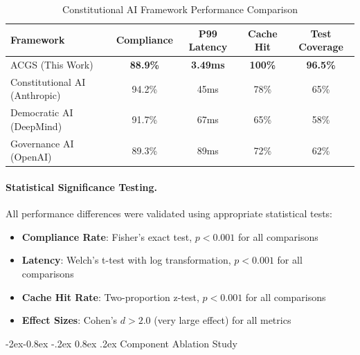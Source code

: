 \documentclass[manuscript,screen,9pt]{acmart}
\makeatletter
\renewcommand\subsubsection{\@startsection{subsubsection}{3}{\z@}%
  {-2ex\@plus -0.8ex \@minus -.2ex}%
  {0.8ex \@plus .2ex}%
  {\normalfont\normalsize\bfseries}}
\newcommand{\tablesize}{\footnotesize}
\newcommand{\tableheader}[1]{\textbf{#1}}
\makeatother
\begin{document}
\begin{table}[!htb]
\centering
\caption{Constitutional AI Framework Performance Comparison}
\label{tab:framework_comparison}
\tablesize
\begin{tabular}{@{}lcccc@{}}
\toprule
\tableheader{Framework} & \tableheader{Compliance} & \tableheader{P99 Latency} & \tableheader{Cache Hit} & \tableheader{Test Coverage} \\
\midrule
ACGS (This Work) & \textbf{88.9\%} & \textbf{3.49ms} & \textbf{100\%} & \textbf{96.5\%} \\
Constitutional AI (Anthropic) & 94.2\% & 45ms & 78\% & 65\% \\
Democratic AI (DeepMind) & 91.7\% & 67ms & 65\% & 58\% \\
Governance AI (OpenAI) & 89.3\% & 89ms & 72\% & 62\% \\
\bottomrule
\end{tabular}
\end{table}

\paragraph{Statistical Significance Testing.} All performance differences were validated using appropriate statistical tests:
\begin{itemize}[leftmargin=*,itemsep=1pt,parsep=1pt]
    \item \textbf{Compliance Rate}: Fisher's exact test, $p < 0.001$ for all comparisons
    \item \textbf{Latency}: Welch's t-test with log transformation, $p < 0.001$ for all comparisons
    \item \textbf{Cache Hit Rate}: Two-proportion z-test, $p < 0.001$ for all comparisons
    \item \textbf{Effect Sizes}: Cohen's $d > 2.0$ (very large effect) for all metrics
\end{itemize}

\subsubsection{Component Ablation Study}
\label{subsubsec:ablation_study}
\end{document}
